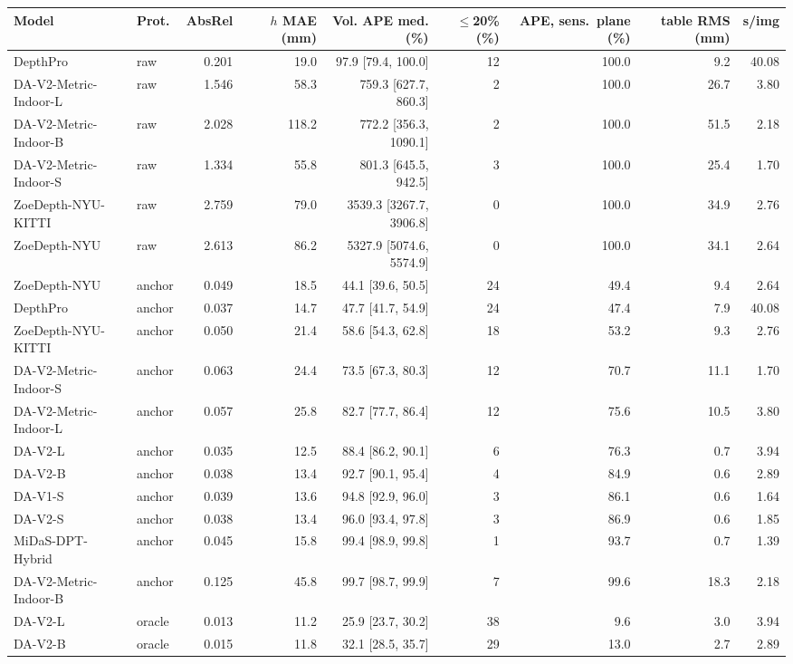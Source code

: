 \begin{tabular}{llrrrrrrr}
\toprule
Model & Prot. & AbsRel & $h$ MAE (mm) & Vol. APE med. (\%) & $\le$20\% (\%) & APE, sens.\ plane (\%) & table RMS (mm) & s/img \\
\midrule
DepthPro & raw & 0.201 & 19.0 & 97.9 [79.4, 100.0] & 12 & 100.0 & 9.2 & 40.08 \\
DA-V2-Metric-Indoor-L & raw & 1.546 & 58.3 & 759.3 [627.7, 860.3] & 2 & 100.0 & 26.7 & 3.80 \\
DA-V2-Metric-Indoor-B & raw & 2.028 & 118.2 & 772.2 [356.3, 1090.1] & 2 & 100.0 & 51.5 & 2.18 \\
DA-V2-Metric-Indoor-S & raw & 1.334 & 55.8 & 801.3 [645.5, 942.5] & 3 & 100.0 & 25.4 & 1.70 \\
ZoeDepth-NYU-KITTI & raw & 2.759 & 79.0 & 3539.3 [3267.7, 3906.8] & 0 & 100.0 & 34.9 & 2.76 \\
ZoeDepth-NYU & raw & 2.613 & 86.2 & 5327.9 [5074.6, 5574.9] & 0 & 100.0 & 34.1 & 2.64 \\
ZoeDepth-NYU & anchor & 0.049 & 18.5 & 44.1 [39.6, 50.5] & 24 & 49.4 & 9.4 & 2.64 \\
DepthPro & anchor & 0.037 & 14.7 & 47.7 [41.7, 54.9] & 24 & 47.4 & 7.9 & 40.08 \\
ZoeDepth-NYU-KITTI & anchor & 0.050 & 21.4 & 58.6 [54.3, 62.8] & 18 & 53.2 & 9.3 & 2.76 \\
DA-V2-Metric-Indoor-S & anchor & 0.063 & 24.4 & 73.5 [67.3, 80.3] & 12 & 70.7 & 11.1 & 1.70 \\
DA-V2-Metric-Indoor-L & anchor & 0.057 & 25.8 & 82.7 [77.7, 86.4] & 12 & 75.6 & 10.5 & 3.80 \\
DA-V2-L & anchor & 0.035 & 12.5 & 88.4 [86.2, 90.1] & 6 & 76.3 & 0.7 & 3.94 \\
DA-V2-B & anchor & 0.038 & 13.4 & 92.7 [90.1, 95.4] & 4 & 84.9 & 0.6 & 2.89 \\
DA-V1-S & anchor & 0.039 & 13.6 & 94.8 [92.9, 96.0] & 3 & 86.1 & 0.6 & 1.64 \\
DA-V2-S & anchor & 0.038 & 13.4 & 96.0 [93.4, 97.8] & 3 & 86.9 & 0.6 & 1.85 \\
MiDaS-DPT-Hybrid & anchor & 0.045 & 15.8 & 99.4 [98.9, 99.8] & 1 & 93.7 & 0.7 & 1.39 \\
DA-V2-Metric-Indoor-B & anchor & 0.125 & 45.8 & 99.7 [98.7, 99.9] & 7 & 99.6 & 18.3 & 2.18 \\
DA-V2-L & oracle & 0.013 & 11.2 & 25.9 [23.7, 30.2] & 38 & 9.6 & 3.0 & 3.94 \\
DA-V2-B & oracle & 0.015 & 11.8 & 32.1 [28.5, 35.7] & 29 & 13.0 & 2.7 & 2.89 \\

\end{tabular}

